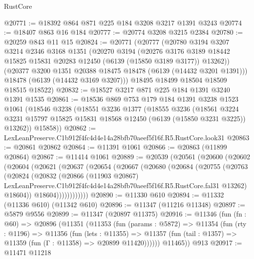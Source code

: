 \begin{lexlean}{RustCore}
\begin{coremodule}
@20771 := @18392 @864 @871 @225 @184 @3208 @3217 @1391 @3243
@20774 := @18407 @863 @16 @184
@20777 := @20774 @3208 @3215 @2384
@20780 := @20259 @843 @11 @15
@20824 := @20771
    (@20777
      (@20780
        @3194
        @3207
        @3214
        @2346
        @3168
        @1351
        (@20270
          @3194
          (@20276
            @3176
            @3189
            @18442
            @15825
            @15831
            @20283
            @12450
            (@6139 (@15850 @3189 @3177))
            @13262))
        (@20377 @3200 @1351 @20388 @18475 @18478 (@6139 (@14432 @3201 @1391)))
        @18478
        (@6139 (@14432 @3169 @3207)))
      @18495
      @18499
      @18504
      @18509
      @18515
      @18522)
@20832 := @18527 @3217 @871 @225 @184 @1391 @3240 @1391 @1535
@20861 := @18536
    @869
    @753
    @179
    @184
    @1391
    @3238
    @1523
    @1061
    (@18546
      @3238
      (@18551
        @3236
        @1377
        (@18555
          @3236
          (@18561
            @3224
            @3231
            @15797
            @15825
            @15831
            @18568
            @12450
            (@6139 (@15850 @3231 @3225))
            @13262))
        @15858))
@20862 := LexLeanPreserve.C1b912f4fc4d4e14a28bfb70aeef5f16f.R5.RustCore.look31
@20863 := @20861 @20862
@20864 := @11391 @1061
@20866 := @20863 (@11899 @20864)
@20867 := @11414 @1061
@20889 := @20539
    (@20561
      (@20600
        (@20602
          (@20604
            (@20621
              (@20637
                (@20654
                  (@20667
                    (@20680
                      (@20684
                        (@20755
                          (@20763
                            (@20824
                              (@20832
                                (@20866
                                  (@11903 @20867)
                                  LexLeanPreserve.C1b912f4fc4d4e14a28bfb70aeef5f16f.R5.RustCore.fal31
                                  @13262)
                                @18604))
                            @18604))))))))))))
@20890 := @11330 @610
@20894 := @11332 (@11336 @610) (@11342 @610)
@20896 := @11347 (@11216 @11348)
@20897 := @5879 @9556
@20899 := @11347 (@20897 @11375)
@20916 := @11346
    (fun (fn : @60) =>
    @20896
      (@11351
        (@11353
          (fun (params : @5872) =>
          @11354
            (fun (rty : @1196) =>
            @11356
              (fun (lets : @11355) =>
              @11357 (fun (tail : @1357) => @11359 (fun (Γ : @11358) => @20899 @11420))))))
        @11465))
    @913
@20917 := @11471 @11218

\end{coremodule}
\end{lexlean}
